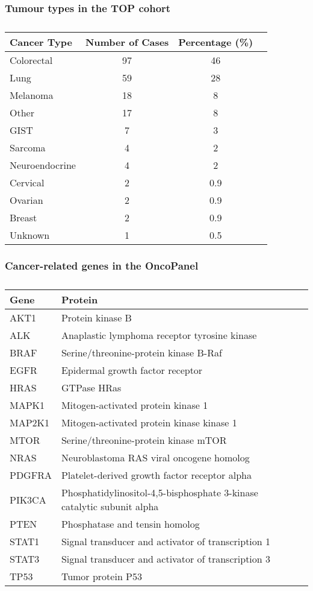 \documentclass{beamer}
\begin{document}
\begin{frame}
\frametitle{Tumour types in the TOP cohort}
\small
\begin{table}
\caption{}
\centering
      \begin{tabular}{lccc}
        \hline
        Cancer Type & Number of Cases & Percentage (\%) \\ \hline
        Colorectal & 97 & 46 \\
        Lung & 59 & 28 \\
        Melanoma & 18 & 8 \\
				Other & 17 & 8 \\
				GIST & 7 & 3 \\
				Sarcoma & 4 & 2 \\
				Neuroendocrine & 4 & 2 \\
				Cervical & 2 & 0.9 \\
				Ovarian & 2 & 0.9 \\
				Breast & 2 & 0.9 \\
				Unknown & 1 & 0.5 \\
        \hline
      \end{tabular}
\end{table}
\end{frame}

\begin{frame}
\frametitle{Cancer-related genes in the OncoPanel}
\scriptsize
\begin{table}
    \caption{}
    \centering
    \begin{tabular}{lll}
    \hline
    Gene & Protein \\
    \hline
    AKT1 & Protein kinase B \\
    ALK & Anaplastic lymphoma receptor tyrosine kinase \\
    BRAF & Serine/threonine-protein kinase B-Raf \\
    EGFR & Epidermal growth factor receptor \\
    HRAS & GTPase HRas \\
    MAPK1 & Mitogen-activated protein kinase 1 \\
    MAP2K1 & Mitogen-activated protein kinase kinase 1 \\
    MTOR & Serine/threonine-protein kinase mTOR \\
    NRAS & Neuroblastoma RAS viral oncogene homolog \\
    PDGFRA & Platelet-derived growth factor receptor alpha \\
    PIK3CA & Phosphatidylinositol-4,5-bisphosphate 3-kinase catalytic subunit alpha \\
    PTEN & Phosphatase and tensin homolog \\
    STAT1 & Signal transducer and activator of transcription 1 \\
    STAT3 & Signal transducer and activator of transcription 3 \\
    TP53 & Tumor protein P53 \\
    \hline
    \end{tabular}
\end{table}
\end{frame}
\end{document}
